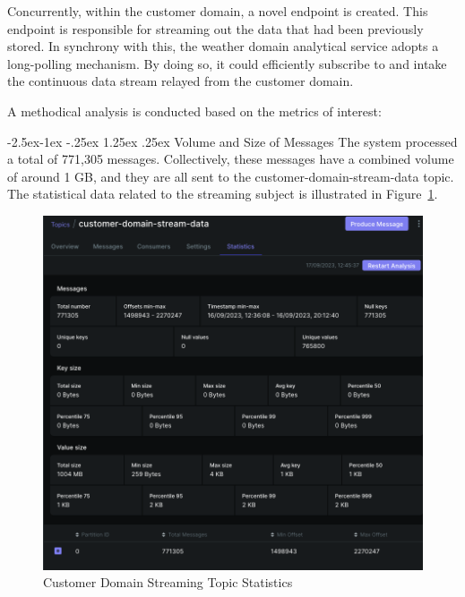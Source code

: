 \documentclass[review]{elsarticle}
\makeatletter
\renewcommand\paragraph{\@startsection{paragraph}{4}{\z@}%
            {-2.5ex\@plus -1ex \@minus -.25ex}%
            {1.25ex \@plus .25ex}%
            {\normalfont\normalsize\itshape}}
\makeatother
\begin{document}
Concurrently, within the customer domain, a novel endpoint is created. This endpoint is responsible for streaming out the data that had been previously stored. In synchrony with this, the weather domain analytical service adopts a long-polling mechanism. By doing so, it could efficiently subscribe to and intake the continuous data stream relayed from the customer domain.

A methodical analysis is conducted based on the metrics of interest:

\paragraph{Volume and Size of Messages} The system processed a total of 771,305 messages. Collectively, these messages have a combined volume of around 1 GB, and they are all sent to the customer-domain-stream-data topic. The statistical data related to the streaming subject is illustrated in Figure~\ref{customerDomainStreamingTopicStatistics}.

\begin{figure}

  \centering

  \includegraphics[width=\columnwidth]{images/customer-domain-stream-data-topic-statistics.png}

  \caption{Customer Domain Streaming Topic Statistics}

  \label{customerDomainStreamingTopicStatistics}

\end{figure}
\end{document}
